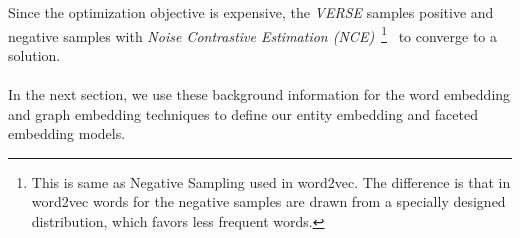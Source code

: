 Since the optimization objective is expensive, the \emph{VERSE} samples positive and negative samples with \emph{Noise Contrastive Estimation (NCE)}~\footnote{This is same as Negative Sampling used in word2vec. The difference is that in word2vec words for the negative samples are drawn from a specially designed distribution, which favors less frequent words. }~ to converge to a solution. \\
\\
\ornament
In the next section, we use these background information for the  word embedding and graph embedding techniques to define our entity embedding and faceted embedding models. 

